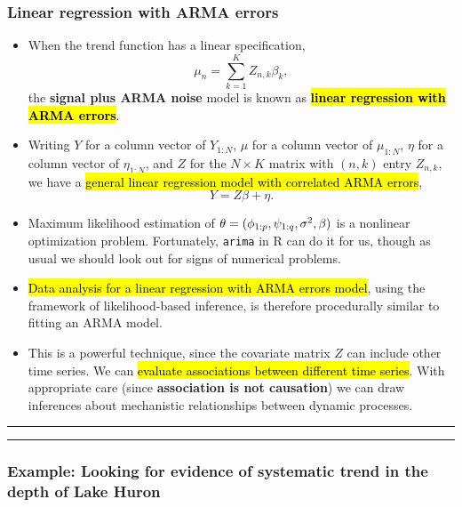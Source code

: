 \documentclass[]{article}
\begin{document}
\subsubsection{Linear regression with ARMA
errors}\label{linear-regression-with-arma-errors}

\begin{itemize}
\item
  When the trend function has a linear specification,
  \[\mu_n = \sum_{k=1}^K Z_{n,k}\beta_k,\]
   the \textbf{signal plus ARMA
  noise} model is known as \hl{\textbf{linear regression with ARMA errors}}.
\item
  Writing \(Y\) for a column vector of \(Y_{1:N}\), \(\mu\) for a column
  vector of \(\mu_{1:N}\), \(\eta\) for a column vector of
  \(\eta_{1:N}\), and \(Z\) for the \(N\times K\) matrix with \((n,k)\)
  entry \(Z_{n,k}\), we have a \hl{general linear regression model with
  correlated ARMA errors}, \[ Y = Z\beta + \eta.\]
\item
  Maximum likelihood estimation of
  \(\theta = (\phi_{1:p},\psi_{1:q},\sigma^2,\beta)\) is a nonlinear
  optimization problem. Fortunately, \texttt{arima} in R can do it for
  us, though as usual we should look out for signs of numerical
  problems.
\item
  \hl{Data analysis for a linear regression with ARMA errors model}, using
  the framework of likelihood-based inference, is therefore procedurally
  similar to fitting an ARMA model.
\item
  This is a powerful technique, since the covariate matrix \(Z\) can
  include other time series. We can \hl{evaluate associations between
  different time series}. With appropriate care (since
  \textbf{association is not causation}) we can draw inferences about
  mechanistic relationships between dynamic processes.
\end{itemize}

\begin{center}\rule{0.5\linewidth}{\linethickness}\end{center}

\begin{center}\rule{0.5\linewidth}{\linethickness}\end{center}

\subsubsection{Example: Looking for evidence of systematic trend in the
depth of Lake
Huron}\label{example-looking-for-evidence-of-systematic-trend-in-the-depth-of-lake-huron}
\end{document}
